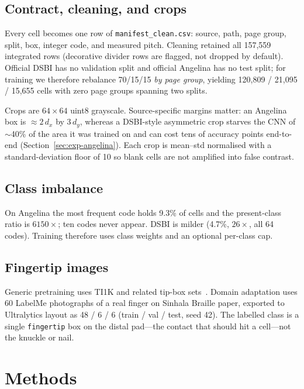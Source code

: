 \documentclass[conference]{IEEEtran}
\begin{document}
\subsection{Contract, cleaning, and crops}
Every cell becomes one row of \texttt{manifest\_clean.csv}: source, path,
page group, split, box, integer code, and measured pitch. Cleaning
retained all 157{,}559 integrated rows (decorative divider rows are
flagged, not dropped by default). Official DSBI has no validation split
and official Angelina has no test split; for training we therefore
rebalance 70/15/15 \textit{by page group}, yielding 120{,}809 / 21{,}095 /
15{,}655 cells with zero page groups spanning two splits.

Crops are $64\times 64$ uint8 grayscale. Source-specific margins matter:
an Angelina box is $\approx 2\,d_x$ by $3\,d_y$, whereas a DSBI-style
asymmetric crop starves the CNN of $\sim$40\% of the area it was trained
on and can cost tens of accuracy points end-to-end
(Section~\ref{sec:exp-angelina}). Each crop is mean--std normalised with
a standard-deviation floor of 10 so blank cells are not amplified into
false contrast.

\subsection{Class imbalance}
On Angelina the most frequent code holds 9.3\% of cells and the present-class
ratio is $6150\times$; ten codes never appear. DSBI is milder (4.7\%,
$26\times$, all 64 codes). Training therefore uses class weights and an
optional per-class cap.

\subsection{Fingertip images}
Generic pretraining uses TI1K and related tip-box sets~\cite{ti1k}.
Domain adaptation uses 60 LabelMe photographs of a real finger on Sinhala
Braille paper, exported to Ultralytics layout as 48 / 6 / 6
(train / val / test, seed 42). The labelled class is a single
\texttt{fingertip} box on the distal pad---the contact that should hit a
cell---not the knuckle or nail.

\section{Methods}
\label{sec:methods}
\end{document}
